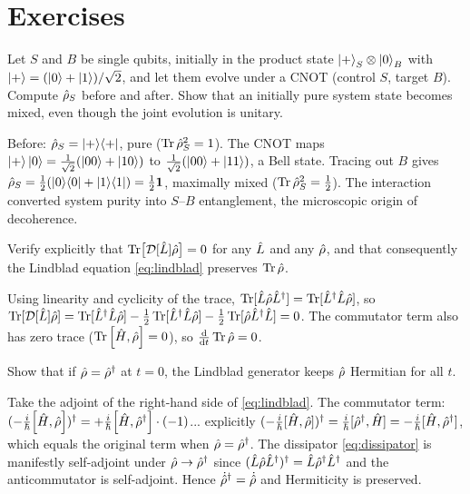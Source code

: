 \section*{Exercises}

\begin{exercise}
Let $S$ and $B$ be single qubits, initially in the product state
$\ket{+}_S\otimes\ket{0}_B$ with $\ket{+}=(\ket0+\ket1)/\sqrt2$,
and let them evolve under a CNOT (control $S$, target $B$). Compute
$\hat{\rho}_S$ before and after. Show that an initially pure system
state becomes mixed, even though the joint evolution is unitary.
\begin{solution}
Before: $\hat{\rho}_S=\ket{+}\!\bra{+}$, pure ($\operatorname{Tr}\hat{\rho}_S^2=1$).
The CNOT maps $\ket{+}\ket0=\tfrac1{\sqrt2}(\ket{00}+\ket{10})$ to
$\tfrac1{\sqrt2}(\ket{00}+\ket{11})$, a Bell state. Tracing out $B$
gives $\hat{\rho}_S=\tfrac12(\ket0\!\bra0+\ket1\!\bra1)=\tfrac12\mathbf{1}$,
maximally mixed ($\operatorname{Tr}\hat{\rho}_S^2=\tfrac12$). The interaction
converted system purity into $S$--$B$ entanglement, the microscopic
origin of decoherence.
\end{solution}
\end{exercise}

\begin{exercise}
Verify explicitly that $\operatorname{Tr}\bigl[\mathcal D[\hat{L}]\hat{\rho}\bigr]=0$
for any $\hat{L}$ and any $\hat{\rho}$, and that consequently the
Lindblad equation \cref{eq:lindblad} preserves $\operatorname{Tr}\hat{\rho}$.
\begin{solution}
Using linearity and cyclicity of the trace,
$\operatorname{Tr}[\hat{L}\hat{\rho}\hat{L}^\dagger]=\operatorname{Tr}[\hat{L}^\dagger\hat{L}\hat{\rho}]$, so
$\operatorname{Tr}[\mathcal D[\hat{L}]\hat{\rho}]=\operatorname{Tr}[\hat{L}^\dagger\hat{L}\hat{\rho}]
-\tfrac12\operatorname{Tr}[\hat{L}^\dagger\hat{L}\hat{\rho}]-\tfrac12\operatorname{Tr}[\hat{\rho}\hat{L}^\dagger\hat{L}]=0$.
The commutator term also has zero trace
($\Tr\comm{\op H}{\op\rho}=0$), so $\tfrac{\dd}{\dd t}\operatorname{Tr}\hat{\rho}=0$.
\end{solution}
\end{exercise}

\begin{exercise}
Show that if $\hat{\rho}=\hat{\rho}^\dagger$ at $t=0$, the Lindblad
generator keeps $\hat{\rho}$ Hermitian for all $t$.
\begin{solution}
Take the adjoint of the right-hand side of \cref{eq:lindblad}. The
commutator term: $(-\tfrac{i}{\hbar}\comm{\op H}{\op\rho})^\dagger
=+\tfrac{i}{\hbar}\comm{\op H}{\op\rho^\dagger}\cdot(-1)$... explicitly
$(-\tfrac i\hbar[\hat{H},\hat{\rho}])^\dagger=\tfrac i\hbar[\hat{\rho}^\dagger,\hat{H}]
=-\tfrac i\hbar[\hat{H},\hat{\rho}^\dagger]$, which equals the original
term when $\hat{\rho}=\hat{\rho}^\dagger$. The dissipator
\cref{eq:dissipator} is manifestly self-adjoint under
$\hat{\rho}\to\hat{\rho}^\dagger$ since $(\hat{L}\hat{\rho}\hat{L}^\dagger)^\dagger
=\hat{L}\hat{\rho}^\dagger\hat{L}^\dagger$ and the anticommutator is
self-adjoint. Hence $\dot{\hat{\rho}}^\dagger=\dot{\hat{\rho}}$ and
Hermiticity is preserved.
\end{solution}
\end{exercise}

